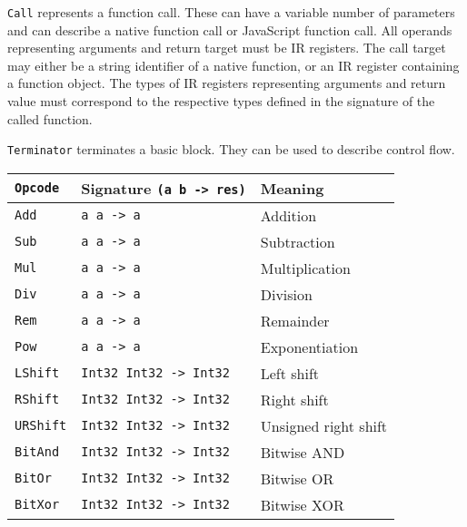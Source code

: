\texttt{Call} represents a function call. These can have a variable number of parameters and can describe a native function call or JavaScript function call. All operands representing arguments and return target must be IR registers. The call target may either be a string identifier of a native function, or an IR register containing a function object. The types of IR registers representing arguments and return value must correspond to the respective types defined in the signature of the called function.

\texttt{Terminator} terminates a basic block. They can be used to describe control flow.


\begin{table}
    \centering
    \begin{tabular}{l | l | l}
        \texttt{Opcode}      & Signature \texttt{(a b -> res)}    &  Meaning                    \\\hline
        \texttt{Add}         & \texttt{a      a     -> a        } &  Addition                   \\
        \texttt{Sub}         & \texttt{a      a     -> a        } &  Subtraction                \\
        \texttt{Mul}         & \texttt{a      a     -> a        } &  Multiplication             \\
        \texttt{Div}         & \texttt{a      a     -> a        } &  Division                   \\
        \texttt{Rem}         & \texttt{a      a     -> a        } &  Remainder                  \\
        \texttt{Pow}         & \texttt{a      a     -> a        } &  Exponentiation             \\
        \texttt{LShift}      & \texttt{Int32  Int32 -> Int32    } &  Left shift                 \\
        \texttt{RShift}      & \texttt{Int32  Int32 -> Int32    } &  Right shift                \\
        \texttt{URShift}     & \texttt{Int32  Int32 -> Int32    } &  Unsigned right shift       \\
        \texttt{BitAnd}      & \texttt{Int32  Int32 -> Int32    } &  Bitwise AND                \\
        \texttt{BitOr}       & \texttt{Int32  Int32 -> Int32    } &  Bitwise OR                 \\
        \texttt{BitXor}      & \texttt{Int32  Int32 -> Int32    } &  Bitwise XOR                \\

\end{tabular}
\end{table}
